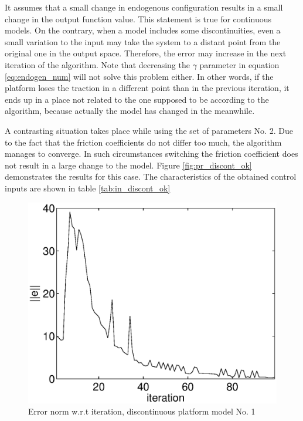 It assumes that a small change in endogenous configuration results in a small change
in the output function value. This statement is true for continuous models. On the contrary,
when a model includes some discontinuities, even a small variation to the input may take
the system to a distant point from the original one in the output space. Therefore, the
error may increase in the next iteration of the algorithm. Note that decreasing
the $\gamma$ parameter in equation \eqref{eq:endogen_num} will not solve this problem either.
In other words, if the platform loses the traction in a different point than in
the previous iteration, it ends up in a place not related to the one supposed to be
according to the algorithm, because actually the model has changed in the meanwhile.

A contrasting situation takes place while using the set of parameters No. 2. Due to the fact
that the friction coefficients do not differ too much, the algorithm manages to converge.
In such circumstances switching the friction coefficient does not result in a large change to the model.
Figure \ref{fig:pr_discont_ok} demonstrates the results for this case. The characteristics
of the obtained control inputs are shown in table \ref{tab:in_discont_ok}

\begin{figure}[htp]
\centering
\includegraphics[height=0.3\textheight]{img/discont_err.eps}
\caption{Error norm w.r.t iteration, discontinuous platform model No. 1}
\label{fig:error_discont}
\end{figure}

